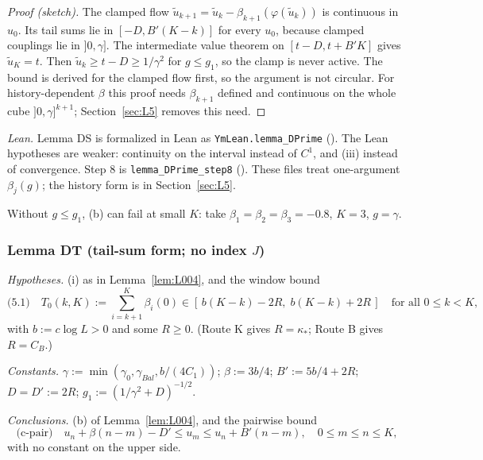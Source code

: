 \begin{proof}[Proof (sketch)]
The clamped flow $\tilde u_{k+1} = \tilde u_k - \beta_{k+1}(\varphi(\tilde u_k))$ is continuous in $u_0$. Its tail sums lie in $[-D, B'(K-k)]$ for every $u_0$, because clamped couplings lie in $]0,\gamma]$. The intermediate value theorem on $[t-D,t+B'K]$ gives $\tilde u_K = t$. Then $\tilde u_k\ge t-D\ge 1/\gamma^2$ for $g\le g_1$, so the clamp is never active. The bound is derived for the clamped flow first, so the argument is not circular. For history-dependent $\beta$ this proof needs $\beta_{k+1}$ defined and continuous on the whole cube $]0,\gamma]^{k+1}$; Section~\ref{sec:L5} removes this need.
\end{proof}

\emph{Lean.} Lemma DS is formalized in Lean as \texttt{YmLean.lemma\_DPrime} (). The Lean hypotheses are weaker: continuity on the interval instead of $C^1$, and (iii) instead of convergence. Step 8 is \texttt{lemma\_DPrime\_step8} (). These files treat one-argument $\beta_j(g)$; the history form is in Section~\ref{sec:L5}.

\begin{remark}\label{rem:4}
Without $g\le g_1$, (b) can fail at small $K$: take $\beta_1=\beta_2=\beta_3=-0.8$, $K=3$, $g=\gamma$.
\end{remark}

\subsubsection{Lemma DT (tail-sum form; no index $J$)}\label{sec:Ddprime}

\begin{lemma}[Lemma DT]\label{lem:L005}
\emph{Hypotheses.} (i) as in Lemma~\ref{lem:L004}, and the window bound
\[
\text{(5.1)}\quad T_0(k,K) := \sum_{i=k+1}^{K}\beta_i(0)\in[\,b(K-k)-2R,\; b(K-k)+2R\,]\quad\text{for all }0\le k<K,
\]
with $b := c\log L>0$ and some $R\ge 0$. (Route K gives $R=\kappa_*$; Route B gives $R=C_B$.)

\emph{Constants.} $\gamma := \min(\gamma_0,\gamma_{Bal},b/(4C_1))$; $\beta := 3b/4$; $B' := 5b/4+2R$; $D=D' := 2R$; $g_1 := (1/\gamma^2+D)^{-1/2}$.

\emph{Conclusions.} (b) of Lemma~\ref{lem:L004}, and the pairwise bound
\[
\text{(c-pair)}\quad u_n+\beta(n-m)-D'\le u_m\le u_n+B'(n-m),\quad 0\le m\le n\le K,
\]
with no constant on the upper side.
\end{lemma}

